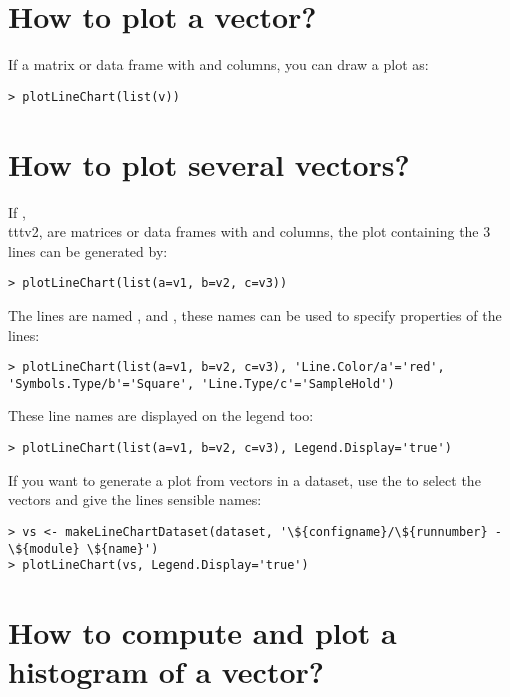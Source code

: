 
\section{How to plot a vector?}

If  a matrix or data frame with  and  columns, you can draw a plot as:

\begin{verbatim}
> plotLineChart(list(v))
\end{verbatim}

\section{How to plot several vectors?}

If , \\ttt{v2},  are matrices or data frames with  and  columns,
the plot containing the 3 lines can be generated by:

\begin{verbatim}
> plotLineChart(list(a=v1, b=v2, c=v3))
\end{verbatim}

The lines are named ,  and , these names can be used to specify
properties of the lines:

\begin{verbatim}
> plotLineChart(list(a=v1, b=v2, c=v3), 'Line.Color/a'='red', 'Symbols.Type/b'='Square', 'Line.Type/c'='SampleHold')
\end{verbatim}

These line names are displayed on the legend too:

\begin{verbatim}
> plotLineChart(list(a=v1, b=v2, c=v3), Legend.Display='true')
\end{verbatim}

If you want to generate a plot from vectors in a dataset, use the  to select
the vectors and give the lines sensible names:

\begin{verbatim}
> vs <- makeLineChartDataset(dataset, '\${configname}/\${runnumber} - \${module} \${name}')
> plotLineChart(vs, Legend.Display='true')
\end{verbatim}

\section{How to compute and plot a histogram of a vector?}

